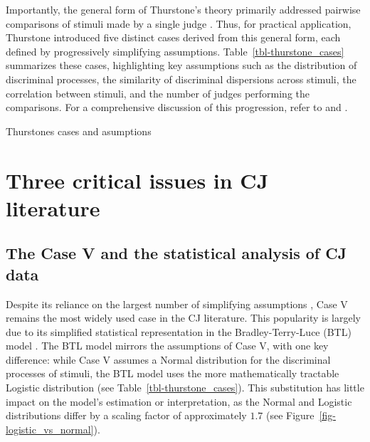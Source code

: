 \documentclass[
  authoryear,
  preprint,
  1p]{elsarticle}
\begin{document}
Importantly, the general form of Thurstone's theory primarily addressed
pairwise comparisons of stimuli made by a single judge
\citep[pp.~267]{Thurstone_1927b}. Thus, for practical application,
Thurstone introduced five distinct cases derived from this general form,
each defined by progressively simplifying assumptions.
Table~\ref{tbl-thurstone_cases} summarizes these cases, highlighting key
assumptions such as the distribution of discriminal processes, the
similarity of discriminal dispersions across stimuli, the correlation
between stimuli, and the number of judges performing the comparisons.
For a comprehensive discussion of this progression, refer to
\citet{Thurstone_1927b} and \citet[pp.~248-253]{Bramley_2008}.

\begin{table}

\caption{\label{tbl-thurstone_cases}Thurstones cases and asumptions}


\end{table}%

\section{Three critical issues in CJ
literature}\label{sec-theory-issues}

\subsection{The Case V and the statistical analysis of CJ
data}\label{sec-theory-issue1}

Despite its reliance on the largest number of simplifying assumptions
\citetext{\citealp[pp.~253]{Bramley_2008}; \citealp[pp.~677]{Kelly_et_al_2022}},
Case V remains the most widely used case in the CJ literature. This
popularity is largely due to its simplified statistical representation
in the Bradley-Terry-Luce (BTL) model
\citep{Bradley_et_al_1952, Luce_1959}. The BTL model mirrors the
assumptions of Case V, with one key difference: while Case V assumes a
Normal distribution for the discriminal processes of stimuli, the BTL
model uses the more mathematically tractable Logistic distribution
\citep[pp.~254]{Andrich_1978, Bramley_2008} (see
Table~\ref{tbl-thurstone_cases}). This substitution has little impact on
the model's estimation or interpretation, as the Normal and Logistic
distributions differ by a scaling factor of approximately \(1.7\)
\citep[pp.~16]{vanderLinden_et_al_2017_I} (see
Figure~\ref{fig-logistic_vs_normal}).
\end{document}
